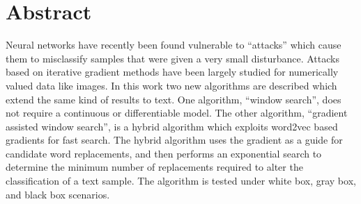 {
\centering
\section*{Abstract}
}

\noindent
Neural networks have recently been found vulnerable to ``attacks'' which cause them to misclassify samples that were given a very small disturbance.  Attacks based on iterative gradient methods have been largely studied for numerically valued data like images.  In this work two new algorithms are described which extend the same kind of results to text.  One algorithm, ``window search'', does not require a continuous or differentiable model.  The other algorithm, ``gradient assisted window search'', is a hybrid algorithm which exploits word2vec based gradients for fast search.  The hybrid algorithm uses the gradient as a guide for candidate word replacements, and then performs an exponential search to determine the minimum number of replacements required to alter the classification of a text sample.  The algorithm is tested under white box, gray box, and black box scenarios.
